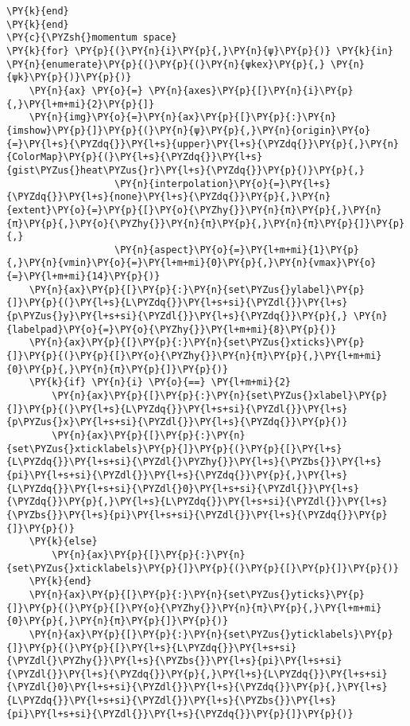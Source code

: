 \begin{Verbatim}[commandchars=\\\{\}]
    \PY{k}{end}
\PY{k}{end}
\PY{c}{\PYZsh{}momentum space}
\PY{k}{for} \PY{p}{(}\PY{n}{i}\PY{p}{,}\PY{n}{ψ}\PY{p}{)} \PY{k}{in} \PY{n}{enumerate}\PY{p}{(}\PY{p}{(}\PY{n}{ψkex}\PY{p}{,} \PY{n}{ψk}\PY{p}{)}\PY{p}{)}
    \PY{n}{ax} \PY{o}{=} \PY{n}{axes}\PY{p}{[}\PY{n}{i}\PY{p}{,}\PY{l+m+mi}{2}\PY{p}{]}
    \PY{n}{img}\PY{o}{=}\PY{n}{ax}\PY{p}{[}\PY{p}{:}\PY{n}{imshow}\PY{p}{]}\PY{p}{(}\PY{n}{ψ}\PY{p}{,}\PY{n}{origin}\PY{o}{=}\PY{l+s}{\PYZdq{}}\PY{l+s}{upper}\PY{l+s}{\PYZdq{}}\PY{p}{,}\PY{n}{ColorMap}\PY{p}{(}\PY{l+s}{\PYZdq{}}\PY{l+s}{gist\PYZus{}heat\PYZus{}r}\PY{l+s}{\PYZdq{}}\PY{p}{)}\PY{p}{,}
                   \PY{n}{interpolation}\PY{o}{=}\PY{l+s}{\PYZdq{}}\PY{l+s}{none}\PY{l+s}{\PYZdq{}}\PY{p}{,}\PY{n}{extent}\PY{o}{=}\PY{p}{[}\PY{o}{\PYZhy{}}\PY{n}{π}\PY{p}{,}\PY{n}{π}\PY{p}{,}\PY{o}{\PYZhy{}}\PY{n}{π}\PY{p}{,}\PY{n}{π}\PY{p}{]}\PY{p}{,}
                   \PY{n}{aspect}\PY{o}{=}\PY{l+m+mi}{1}\PY{p}{,}\PY{n}{vmin}\PY{o}{=}\PY{l+m+mi}{0}\PY{p}{,}\PY{n}{vmax}\PY{o}{=}\PY{l+m+mi}{14}\PY{p}{)}
    \PY{n}{ax}\PY{p}{[}\PY{p}{:}\PY{n}{set\PYZus{}ylabel}\PY{p}{]}\PY{p}{(}\PY{l+s}{L\PYZdq{}}\PY{l+s+si}{\PYZdl{}}\PY{l+s}{p\PYZus{}y}\PY{l+s+si}{\PYZdl{}}\PY{l+s}{\PYZdq{}}\PY{p}{,} \PY{n}{labelpad}\PY{o}{=}\PY{o}{\PYZhy{}}\PY{l+m+mi}{8}\PY{p}{)}
    \PY{n}{ax}\PY{p}{[}\PY{p}{:}\PY{n}{set\PYZus{}xticks}\PY{p}{]}\PY{p}{(}\PY{p}{[}\PY{o}{\PYZhy{}}\PY{n}{π}\PY{p}{,}\PY{l+m+mi}{0}\PY{p}{,}\PY{n}{π}\PY{p}{]}\PY{p}{)}
    \PY{k}{if} \PY{n}{i} \PY{o}{==} \PY{l+m+mi}{2}
        \PY{n}{ax}\PY{p}{[}\PY{p}{:}\PY{n}{set\PYZus{}xlabel}\PY{p}{]}\PY{p}{(}\PY{l+s}{L\PYZdq{}}\PY{l+s+si}{\PYZdl{}}\PY{l+s}{p\PYZus{}x}\PY{l+s+si}{\PYZdl{}}\PY{l+s}{\PYZdq{}}\PY{p}{)}
        \PY{n}{ax}\PY{p}{[}\PY{p}{:}\PY{n}{set\PYZus{}xticklabels}\PY{p}{]}\PY{p}{(}\PY{p}{[}\PY{l+s}{L\PYZdq{}}\PY{l+s+si}{\PYZdl{}\PYZhy{}}\PY{l+s}{\PYZbs{}}\PY{l+s}{pi}\PY{l+s+si}{\PYZdl{}}\PY{l+s}{\PYZdq{}}\PY{p}{,}\PY{l+s}{L\PYZdq{}}\PY{l+s+si}{\PYZdl{}0}\PY{l+s+si}{\PYZdl{}}\PY{l+s}{\PYZdq{}}\PY{p}{,}\PY{l+s}{L\PYZdq{}}\PY{l+s+si}{\PYZdl{}}\PY{l+s}{\PYZbs{}}\PY{l+s}{pi}\PY{l+s+si}{\PYZdl{}}\PY{l+s}{\PYZdq{}}\PY{p}{]}\PY{p}{)}
    \PY{k}{else}
        \PY{n}{ax}\PY{p}{[}\PY{p}{:}\PY{n}{set\PYZus{}xticklabels}\PY{p}{]}\PY{p}{(}\PY{p}{[}\PY{p}{]}\PY{p}{)}
    \PY{k}{end}
    \PY{n}{ax}\PY{p}{[}\PY{p}{:}\PY{n}{set\PYZus{}yticks}\PY{p}{]}\PY{p}{(}\PY{p}{[}\PY{o}{\PYZhy{}}\PY{n}{π}\PY{p}{,}\PY{l+m+mi}{0}\PY{p}{,}\PY{n}{π}\PY{p}{]}\PY{p}{)}
    \PY{n}{ax}\PY{p}{[}\PY{p}{:}\PY{n}{set\PYZus{}yticklabels}\PY{p}{]}\PY{p}{(}\PY{p}{[}\PY{l+s}{L\PYZdq{}}\PY{l+s+si}{\PYZdl{}\PYZhy{}}\PY{l+s}{\PYZbs{}}\PY{l+s}{pi}\PY{l+s+si}{\PYZdl{}}\PY{l+s}{\PYZdq{}}\PY{p}{,}\PY{l+s}{L\PYZdq{}}\PY{l+s+si}{\PYZdl{}0}\PY{l+s+si}{\PYZdl{}}\PY{l+s}{\PYZdq{}}\PY{p}{,}\PY{l+s}{L\PYZdq{}}\PY{l+s+si}{\PYZdl{}}\PY{l+s}{\PYZbs{}}\PY{l+s}{pi}\PY{l+s+si}{\PYZdl{}}\PY{l+s}{\PYZdq{}}\PY{p}{]}\PY{p}{)}

\end{Verbatim}
